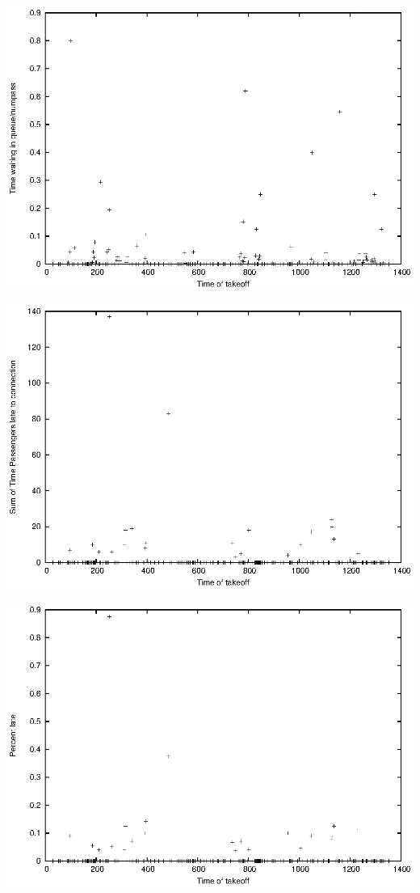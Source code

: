 \documentclass[titlepage]{article}
\numberwithin{equation}{section}
\begin{document}
\includegraphics{test2.eps}

\includegraphics{test3.eps}

\includegraphics{test4.eps}
\end{document}
